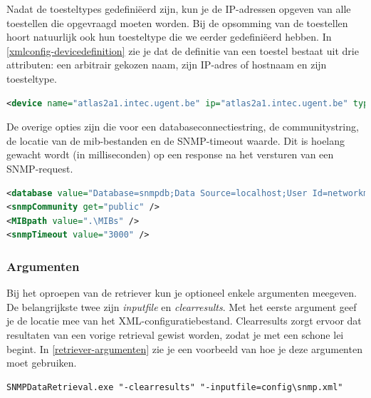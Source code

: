 Nadat de toesteltypes gedefiniëerd zijn, kun je de IP-adressen opgeven van alle toestellen die opgevraagd moeten worden.
Bij de opsomming van de toestellen hoort natuurlijk ook hun toesteltype die we eerder gedefiniëerd hebben.
In \cref{xmlconfig-devicedefinition} zie je dat de definitie van een toestel bestaat uit drie attributen: een arbitrair gekozen naam, zijn IP-adres of hostnaam en zijn toesteltype. 

\begin{lstlisting}[language=XML, float=h, caption={Definitie van een toestel in het XML-configuratiebestand}, label=xmlconfig-devicedefinition]
<device name="atlas2a1.intec.ugent.be" ip="atlas2a1.intec.ugent.be" type="Bridge" />
\end{lstlisting}

De overige opties zijn die voor een databaseconnectiestring, de communitystring, de locatie van de \gls{mib}-bestanden en de SNMP-timeout waarde.
Dit is hoelang gewacht wordt (in milliseconden) op een response na het versturen van een SNMP-request.

\begin{lstlisting}[language=XML, float=h, caption={Overige opties in het XML-configuratiebestand}, label=xmlconfig-misc]
<database value="Database=snmpdb;Data Source=localhost;User Id=networkminer;Password=SomePassword;Port=3306;old syntax=yes" />
<snmpCommunity get="public" />
<MIBpath value=".\MIBs" />
<snmpTimeout value="3000" />
\end{lstlisting}


\subsubsection{Argumenten}
Bij het oproepen van de retriever kun je optioneel enkele argumenten meegeven.
De belangrijkste twee zijn \emph{inputfile} en \emph{clearresults}.
Met het eerste argument geef je de locatie mee van het XML-configuratiebestand.
Clearresults zorgt ervoor dat resultaten van een vorige retrieval gewist worden, zodat je met een schone lei begint.
In \cref{retriever-argumenten} zie je een voorbeeld van hoe je deze argumenten moet gebruiken.

\begin{lstlisting}[float=h, caption={Oproepen van SNMP Data Retriever met twee argumenten}, label=retriever-argumenten]
SNMPDataRetrieval.exe "-clearresults" "-inputfile=config\snmp.xml"
\end{lstlisting}



